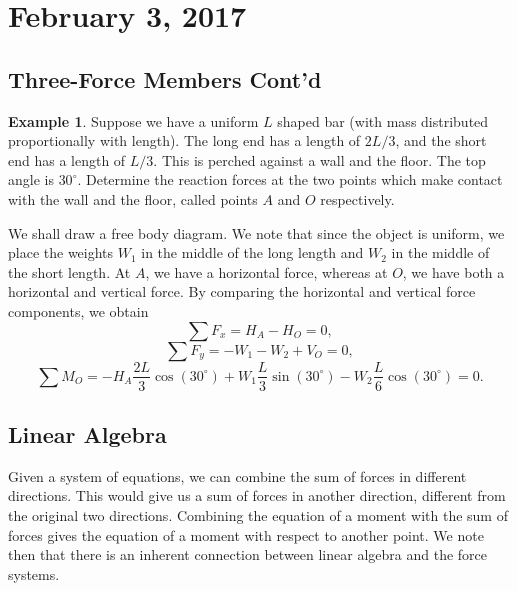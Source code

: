 \documentclass[11pt]{article}
\theoremstyle{plain} %
\theoremstyle{definition}
\theoremstyle{example}
\newtheorem*{example}{Example}
\theoremstyle{remark}
\begin{document}
\section{February 3, 2017}
\subsection{Three-Force Members Cont'd}

\begin{example}
Suppose we have a uniform $L$ shaped bar (with mass distributed proportionally with length). The long end has a length of $2L/3$, and the short end has a length of $L/3$. This is perched against a wall and the floor. The top angle is $30^{\circ}$. Determine the reaction forces at the two points which make contact with the wall and the floor, called points $A$ and $O$ respectively. 
\end{example}

We shall draw a free body diagram. We note that since the object is uniform, we place the weights $W_1$ in the middle of the long length and $W_2$ in the middle of the short length. At $A$, we have a horizontal force, whereas at $O$, we have both a horizontal and vertical force. By comparing the horizontal and vertical force components, we obtain
$$\sum F_x = H_A-H_O=0,$$
$$\sum F_y = -W_1-W_2+V_O = 0,$$
$$\sum M_O = -H_A\frac{2L}{3}\cos\left(30^{\circ}\right)+W_1\frac{L}{3}\sin\left(30^{\circ}\right)-W_2\frac{L}{6}\cos\left(30^{\circ}\right)=0.$$

\subsection{Linear Algebra}
Given a system of equations, we can combine the sum of forces in different directions. This would give us a sum of forces in another direction, different from the original two directions. Combining the equation of a moment with the sum of forces gives the equation of a moment with respect to another point. We note then that there is an inherent connection between linear algebra and the force systems. 
\end{document}
